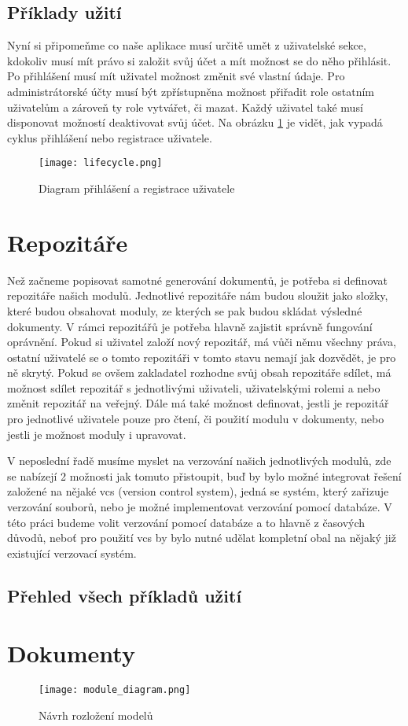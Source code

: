 \subsection{Příklady užití}

Nyní si připomeňme co naše aplikace musí určitě umět z uživatelské sekce, kdokoliv musí mít právo si založit svůj účet a mít možnost se do něho přihlásit.
Po přihlášení musí mít uživatel možnost změnit své vlastní údaje. Pro administrátorské účty musí být zpřístupněna možnost přiřadit role ostatním uživatelům
a zároveň ty role vytvářet, či mazat. Každý uživatel také musí disponovat možností deaktivovat svůj účet. Na obrázku \ref{fig:userFlow} je vidět, jak vypadá
cyklus přihlášení nebo registrace uživatele.

\begin{figure}[h]
    \centering
    \texttt{[image: lifecycle.png]}
    \caption{Diagram přihlášení a registrace uživatele}
    \label{fig:userFlow}
\end{figure}

\section{Repozitáře}

Než začneme popisovat samotné generování dokumentů, je potřeba si definovat repozitáře našich modulů. Jednotlivé repozitáře nám budou sloužit jako složky,
které budou obsahovat moduly, ze kterých se pak budou skládat výsledné dokumenty. V rámci repozitářů je potřeba hlavně zajistit správně fungování oprávnění.
Pokud si uživatel založí nový repozitář, má vůči němu všechny práva, ostatní uživatelé se o tomto repozitáři v tomto stavu nemají jak dozvědět, je pro ně
skrytý. Pokud se ovšem zakladatel rozhodne svůj obsah repozitáře sdílet, má možnost sdílet repozitář s jednotlivými uživateli, uživatelskými rolemi a nebo
změnit repozitář na veřejný. Dále má také možnost definovat, jestli je repozitář pro jednotlivé uživatele pouze pro čtení, či použití modulu v dokumenty,
nebo jestli je možnost moduly i upravovat.

V neposlední řadě musíme myslet na verzování našich jednotlivých modulů, zde se nabízejí 2 možnosti jak tomuto přistoupit, buď by bylo možné integrovat
řešení založené na nějaké vcs (version control system), jedná se systém, který zařizuje verzování souborů,
nebo je možné implementovat verzování pomocí databáze. V této práci budeme volit verzování pomocí databáze a to hlavně z časových důvodů, neboť
pro použití vcs by bylo nutné udělat kompletní obal na nějaký již existující verzovací systém.

\subsection{Přehled všech příkladů užití}

\section{Dokumenty}

\begin{figure}[h]
    \centering
    \texttt{[image: module\_diagram.png]}
    \caption{Návrh rozložení modelů}
    \label{fig:moduleDia}
\end{figure}